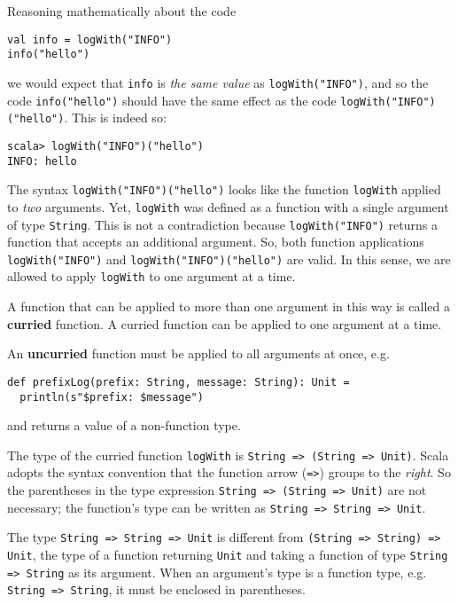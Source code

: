 Reasoning mathematically about the code
\begin{lstlisting}
val info = logWith("INFO")
info("hello")
\end{lstlisting}
we would expect that \lstinline!info! is \emph{the same value} as
\lstinline!logWith("INFO")!, and so the code \lstinline!info("hello")!
should have the same effect as the code \lstinline!logWith("INFO")("hello")!.
This is indeed so:
\begin{lstlisting}
scala> logWith("INFO")("hello")
INFO: hello
\end{lstlisting}
The syntax \lstinline!logWith("INFO")("hello")! looks like the function
\lstinline!logWith! applied to \emph{two} arguments. Yet, \lstinline!logWith!
was defined as a function with a single argument of type \lstinline!String!.
This is not a contradiction because \lstinline!logWith("INFO")! returns
a function that accepts an additional argument. So, both function
applications \lstinline!logWith("INFO")! and \lstinline!logWith("INFO")("hello")!
are valid. In this sense, we are allowed to apply \lstinline!logWith!
to one argument at a time.

A function that can be applied to more than one argument in this way
is called a \textbf{curried} function. A
curried function can be applied to one argument at a time.

An \textbf{uncurried} function must be
applied to all arguments at once, e.g.
\begin{lstlisting}
def prefixLog(prefix: String, message: String): Unit =
  println(s"$prefix: $message")
\end{lstlisting}
and returns a value of a non-function type.

The type of the curried function \lstinline!logWith! is \lstinline!String => (String => Unit)!.
Scala adopts the syntax convention that the function arrow (\lstinline!=>!)
groups to the \emph{right}. So the parentheses in the type expression
\lstinline!String => (String => Unit)! are not necessary; the function's
type can be written as \lstinline!String => String => Unit!.

The type \lstinline!String => String => Unit! is different from \lstinline!(String => String) => Unit!,
\textendash{} the type of a function returning \lstinline!Unit! and
taking a function of type \lstinline!String => String! as its argument.
When an argument's type is a function type, e.g. \lstinline!String => String!,
it must be enclosed in parentheses.

